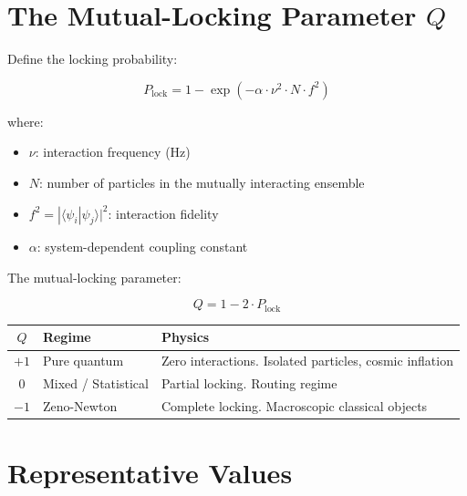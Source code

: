 \documentclass[12pt]{article}
\begin{document}
\section{The Mutual-Locking Parameter $Q$}

Define the locking probability:

\begin{equation}
P_{\text{lock}} = 1 - \exp(-\alpha \cdot \nu^2 \cdot N \cdot f^2)
\end{equation}

where:
\begin{itemize}
\item $\nu$: interaction frequency (Hz)
\item $N$: number of particles in the mutually interacting ensemble
\item $f^2 = |\langle\psi_i|\psi_j\rangle|^2$: interaction fidelity
\item $\alpha$: system-dependent coupling constant
\end{itemize}

The mutual-locking parameter:

\begin{equation}
Q = 1 - 2 \cdot P_{\text{lock}}
\end{equation}

\begin{center}
\begin{tabular}{c|l|l}
$Q$ & Regime & Physics \\
\hline
$+1$ & Pure quantum & Zero interactions. Isolated particles, cosmic inflation \\
$0$ & Mixed / Statistical & Partial locking. Routing regime \\
$-1$ & Zeno-Newton & Complete locking. Macroscopic classical objects \\
\end{tabular}
\end{center}

\section{Representative Values}
\end{document}
